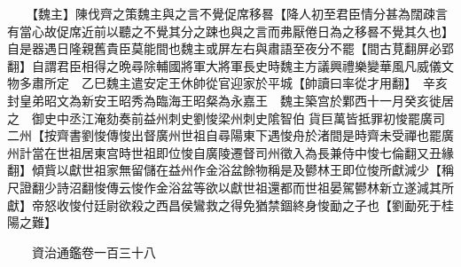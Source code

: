 　　【魏主】陳伐齊之策魏主與之言不覺促席移晷【降人初至君臣情分甚為闊疎言有當心故促席近前以聽之不覺其分之踈也與之言而弗厭倦日為之移晷不覺其久也】自是器遇日隆親舊貴臣莫能間也魏主或屏左右與肅語至夜分不罷【間古莧翻屏必郢翻】自謂君臣相得之晩尋除輔國將軍大將軍長史時魏主方議興禮樂變華風凡威儀文物多肅所定　乙巳魏主遣安定王休帥從官迎家於平城【帥讀曰率從才用翻】　辛亥封皇弟昭文為新安王昭秀為臨海王昭粲為永嘉王　魏主築宫於鄴西十一月癸亥徙居之　御史中丞江淹劾奏前益州刺史劉悛梁州刺史隂智伯貨巨萬皆抵罪初悛罷廣司二州【按齊書劉悛傳悛出督廣州世祖自尋陽東下遇悛舟於渚間是時齊未受禪也罷廣州計當在世祖居東宫時世祖即位悛自廣陵遷督司州徵入為長兼侍中悛七倫翻又丑緣翻】傾貲以獻世祖家無留儲在益州作金浴盆餘物稱是及鬰林王即位悛所獻減少【稱尺證翻少詩沼翻悛傳云悛作金浴盆等欲以獻世祖還都而世祖晏駕鬰林新立遂減其所獻】帝怒收悛付廷尉欲殺之西昌侯鸞救之得免猶禁錮終身悛勔之子也【劉勔死于桂陽之難】

　　資治通鑑卷一百三十八  
    


 


 



 

 
  







 


　　
　　
　
　
　


　　

　















	
	









































